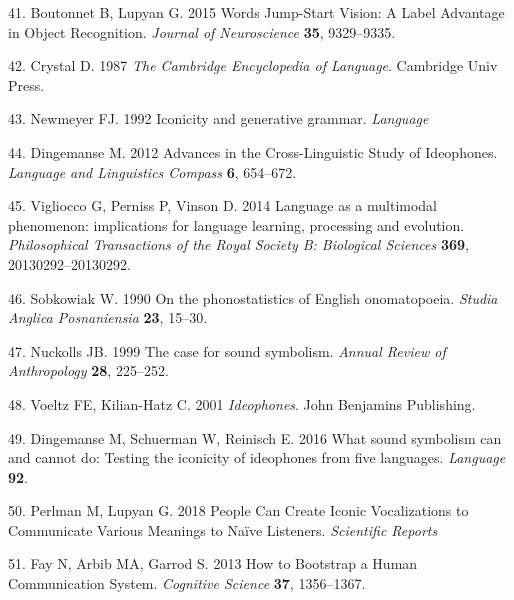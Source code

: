\documentclass[english,floatsintext,man]{apa6}
\theoremstyle{definition}
\theoremstyle{definition}
\theoremstyle{definition}
\theoremstyle{remark}
\begin{document}
\leavevmode\hypertarget{ref-Boutonnet:2015fz}{}%
41. Boutonnet B, Lupyan G. 2015 Words Jump-Start Vision: A Label
Advantage in Object Recognition. \emph{Journal of Neuroscience}
\textbf{35}, 9329--9335.

\leavevmode\hypertarget{ref-Crystal:1987en}{}%
42. Crystal D. 1987 \emph{The Cambridge Encyclopedia of Language}.
Cambridge Univ Press.

\leavevmode\hypertarget{ref-Newmeyer:1992we}{}%
43. Newmeyer FJ. 1992 Iconicity and generative grammar. \emph{Language}

\leavevmode\hypertarget{ref-Dingemanse:2012fc}{}%
44. Dingemanse M. 2012 Advances in the Cross-Linguistic Study of
Ideophones. \emph{Language and Linguistics Compass} \textbf{6},
654--672.

\leavevmode\hypertarget{ref-Vigliocco:2014fc}{}%
45. Vigliocco G, Perniss P, Vinson D. 2014 Language as a multimodal
phenomenon: implications for language learning, processing and
evolution. \emph{Philosophical Transactions of the Royal Society B:
Biological Sciences} \textbf{369}, 20130292--20130292.

\leavevmode\hypertarget{ref-Sobkowiak:1990ph}{}%
46. Sobkowiak W. 1990 On the phonostatistics of English onomatopoeia.
\emph{Studia Anglica Posnaniensia} \textbf{23}, 15--30.

\leavevmode\hypertarget{ref-Nuckolls:1999ca}{}%
47. Nuckolls JB. 1999 The case for sound symbolism. \emph{Annual Review
of Anthropology} \textbf{28}, 225--252.

\leavevmode\hypertarget{ref-Voeltz:2001vv}{}%
48. Voeltz FE, Kilian-Hatz C. 2001 \emph{Ideophones}. John Benjamins
Publishing.

\leavevmode\hypertarget{ref-Dingemanse:2016vd}{}%
49. Dingemanse M, Schuerman W, Reinisch E. 2016 What sound symbolism can
and cannot do: Testing the iconicity of ideophones from five languages.
\emph{Language} \textbf{92}.

\leavevmode\hypertarget{ref-Perlman:2018cs}{}%
50. Perlman M, Lupyan G. 2018 People Can Create Iconic Vocalizations to
Communicate Various Meanings to Naïve Listeners. \emph{Scientific
Reports}

\leavevmode\hypertarget{ref-Fay:2013jpa}{}%
51. Fay N, Arbib MA, Garrod S. 2013 How to Bootstrap a Human
Communication System. \emph{Cognitive Science} \textbf{37}, 1356--1367.


\clearpage
\renewcommand{\listtablename}{Table captions}
\listoftables

\clearpage
\renewcommand{\listfigurename}{Figure captions}
\listoffigures
\end{document}
